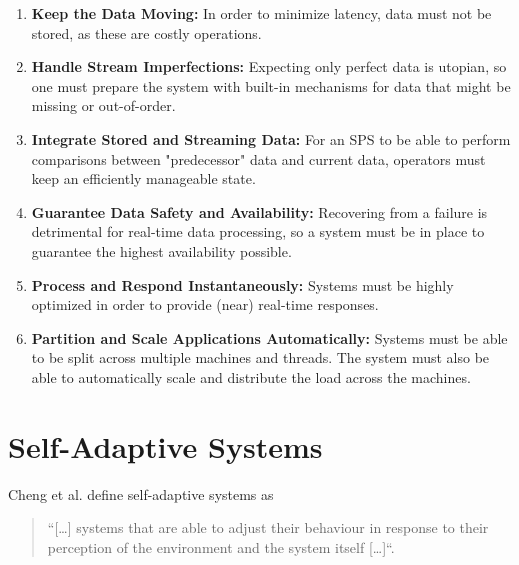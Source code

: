         \begin{enumerate}
        \label{enum:requirements}
            \item \textbf{Keep the Data Moving:} 
                In order to minimize latency, data must not be stored, as these are costly operations.
            \item \textbf{Handle Stream Imperfections:} 
                Expecting only perfect data is utopian, so one must prepare the system with built-in mechanisms for data that might be missing or out-of-order.
            \item \textbf{Integrate Stored and Streaming Data:} 
                For an SPS to be able to perform comparisons between "predecessor" data and current data, operators must keep an efficiently manageable state.
            \item \textbf{Guarantee Data Safety and Availability:} 
                Recovering from a failure is detrimental for real-time data processing, so a system must be in place to guarantee the highest availability possible.
            \item \textbf{Process and Respond Instantaneously:} 
                Systems must be highly optimized in order to provide (near) real-time responses.
            \item \textbf{Partition and Scale Applications Automatically:} 
                Systems must be able to be split across multiple machines and threads.
                The system must also be able to automatically scale and distribute the load across the machines.

        \end{enumerate}

    \section{Self-Adaptive Systems}
    \label{sec:self-adaptive}
    
    Cheng et al. define self-adaptive systems as
    \begin{quotation}
        ``[\ldots] systems that are able to adjust their behaviour in response to their perception of the environment and the
        system itself [\ldots]``\cite[p.1]{Cheng:2009:SES:1573856.1573858}.
    \end{quotation}
    
